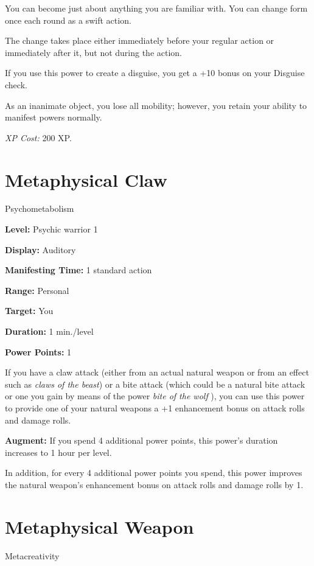\documentclass{article}
\begin{document}
You can become just about anything you are familiar with. You can change form once 
each round as a swift action.

The change takes place either immediately before your regular action or immediately 
after it, but not during the action.

If you use this power to create a disguise, you get a +10 bonus on your Disguise 
check.

As an inanimate object, you lose all mobility; however, you retain your ability 
to manifest powers normally.

\textit{XP Cost: }200 XP.

\vspace{12pt}
\section*{Metaphysical Claw}

Psychometabolism

\textbf{Level:} Psychic warrior 1

\textbf{Display:} Auditory

\textbf{Manifesting Time:} 1 standard action

\textbf{Range:} Personal

\textbf{Target:} You

\textbf{Duration:} 1 min./level

\textbf{Power Points:} 1

If you have a claw attack (either from an actual natural weapon or from an effect 
such as \textit{claws of the beast}) or a bite attack (which could be a natural 
bite attack or one you gain by means of the power \textit{bite of the wolf }), 
you can use this power to provide one of your natural weapons a +1 enhancement 
bonus on attack rolls and damage rolls.

\textbf{Augment:} If you spend 4 additional power points, this power's duration 
increases to 1 hour per level.

In addition, for every 4 additional power points you spend, this power improves 
the natural weapon's enhancement bonus on attack rolls and damage rolls by 1.

\vspace{12pt}
\section*{Metaphysical Weapon}

Metacreativity
\end{document}
